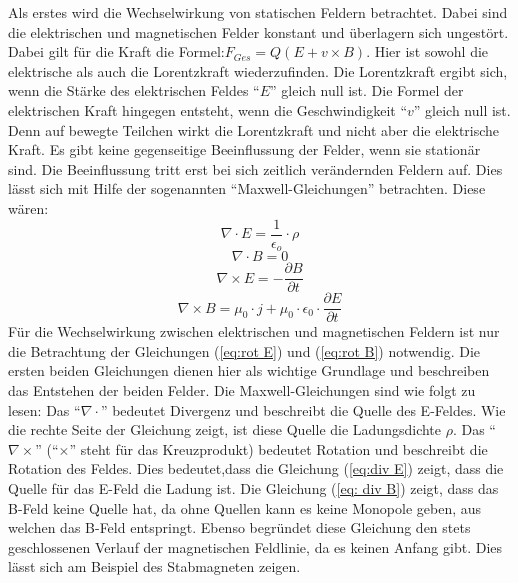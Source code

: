 Als erstes wird die Wechselwirkung von statischen Feldern betrachtet.
Dabei sind die elektrischen und magnetischen Felder konstant und überlagern sich ungestört.
Dabei gilt für die Kraft die Formel:$F_{Ges} = Q (E + v \times B)$.
Hier ist sowohl die elektrische als auch die Lorentzkraft wiederzufinden.
Die Lorentzkraft ergibt sich, wenn die Stärke des elektrischen Feldes "`$E$"' gleich null ist.
Die Formel der elektrischen Kraft hingegen entsteht, wenn die Geschwindigkeit "`$v$"' gleich null ist.
Denn auf bewegte Teilchen wirkt die Lorentzkraft und nicht aber die elektrische Kraft.
Es gibt keine gegenseitige Beeinflussung der Felder, wenn sie stationär sind. 
Die Beeinflussung tritt erst bei sich zeitlich verändernden Feldern auf.
Dies lässt sich mit Hilfe der sogenannten "`Maxwell-Gleichungen"' betrachten.
Diese wären:
\begin{equation}
\label{eq:div E}
    \nabla \cdot E = \frac{1}{\epsilon_o} \cdot \rho
\end{equation}
\begin{equation}
\label{eq: div B}
    \nabla \cdot B = 0
\end{equation}
\begin{equation}
\label{eq:rot E}
    \nabla \times E = - \frac{\partial B}{\partial t}
\end{equation}
\begin{equation}
\label{eq:rot B}
    \nabla \times B = \mu_0 \cdot j + \mu_0 \cdot \epsilon_0 \cdot \frac{\partial E}{\partial t}
\end{equation}
Für die Wechselwirkung zwischen elektrischen und magnetischen Feldern ist nur die Betrachtung der Gleichungen (\ref{eq:rot E}) und (\ref{eq:rot B}) notwendig.
Die ersten beiden Gleichungen dienen hier als wichtige Grundlage und beschreiben das Entstehen der beiden Felder.
Die Maxwell-Gleichungen sind wie folgt zu lesen: 
Das "`$ \nabla \cdot$"' bedeutet Divergenz und beschreibt die Quelle des E-Feldes.
Wie die rechte Seite der Gleichung zeigt, ist diese Quelle die Ladungsdichte $\rho$.
Das "`$ \nabla \times$"' ("`$\times$"' steht für das Kreuzprodukt) bedeutet Rotation und beschreibt die Rotation des Feldes.
Dies bedeutet,dass die Gleichung (\ref{eq:div E}) zeigt, dass die Quelle für das E-Feld die Ladung ist.
Die Gleichung (\ref{eq: div B}) zeigt, dass das B-Feld keine Quelle hat, da ohne Quellen kann es keine Monopole geben, aus welchen das B-Feld entspringt.
Ebenso begründet diese Gleichung den stets geschlossenen Verlauf der magnetischen Feldlinie, da es keinen Anfang gibt.
Dies lässt sich am Beispiel des Stabmagneten zeigen.
